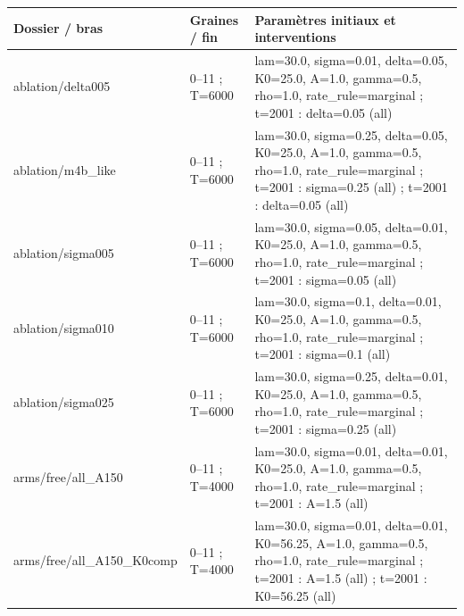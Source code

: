 {\scriptsize\begin{longtable}{@{}p{.27\linewidth}p{.14\linewidth}p{.53\linewidth}@{}}
\toprule Dossier / bras & Graines / fin & Paramètres initiaux et interventions \\\midrule\endhead
ablation/\allowbreak{}delta005 & 0--11 ; T=6000 & lam=30.0,\allowbreak{}  sigma=0.01,\allowbreak{}  delta=0.05,\allowbreak{}  K0=25.0,\allowbreak{}  A=1.0,\allowbreak{}  gamma=0.5,\allowbreak{}  rho=1.0,\allowbreak{}  rate\_\allowbreak{}rule=marginal ; t=2001 : delta=0.05 (all) \\
ablation/\allowbreak{}m4b\_\allowbreak{}like & 0--11 ; T=6000 & lam=30.0,\allowbreak{}  sigma=0.25,\allowbreak{}  delta=0.05,\allowbreak{}  K0=25.0,\allowbreak{}  A=1.0,\allowbreak{}  gamma=0.5,\allowbreak{}  rho=1.0,\allowbreak{}  rate\_\allowbreak{}rule=marginal ; t=2001 : sigma=0.25 (all) ; t=2001 : delta=0.05 (all) \\
ablation/\allowbreak{}sigma005 & 0--11 ; T=6000 & lam=30.0,\allowbreak{}  sigma=0.05,\allowbreak{}  delta=0.01,\allowbreak{}  K0=25.0,\allowbreak{}  A=1.0,\allowbreak{}  gamma=0.5,\allowbreak{}  rho=1.0,\allowbreak{}  rate\_\allowbreak{}rule=marginal ; t=2001 : sigma=0.05 (all) \\
ablation/\allowbreak{}sigma010 & 0--11 ; T=6000 & lam=30.0,\allowbreak{}  sigma=0.1,\allowbreak{}  delta=0.01,\allowbreak{}  K0=25.0,\allowbreak{}  A=1.0,\allowbreak{}  gamma=0.5,\allowbreak{}  rho=1.0,\allowbreak{}  rate\_\allowbreak{}rule=marginal ; t=2001 : sigma=0.1 (all) \\
ablation/\allowbreak{}sigma025 & 0--11 ; T=6000 & lam=30.0,\allowbreak{}  sigma=0.25,\allowbreak{}  delta=0.01,\allowbreak{}  K0=25.0,\allowbreak{}  A=1.0,\allowbreak{}  gamma=0.5,\allowbreak{}  rho=1.0,\allowbreak{}  rate\_\allowbreak{}rule=marginal ; t=2001 : sigma=0.25 (all) \\
arms/\allowbreak{}free/\allowbreak{}all\_\allowbreak{}A150 & 0--11 ; T=4000 & lam=30.0,\allowbreak{}  sigma=0.01,\allowbreak{}  delta=0.01,\allowbreak{}  K0=25.0,\allowbreak{}  A=1.0,\allowbreak{}  gamma=0.5,\allowbreak{}  rho=1.0,\allowbreak{}  rate\_\allowbreak{}rule=marginal ; t=2001 : A=1.5 (all) \\
arms/\allowbreak{}free/\allowbreak{}all\_\allowbreak{}A150\_\allowbreak{}K0comp & 0--11 ; T=4000 & lam=30.0,\allowbreak{}  sigma=0.01,\allowbreak{}  delta=0.01,\allowbreak{}  K0=56.25,\allowbreak{}  A=1.0,\allowbreak{}  gamma=0.5,\allowbreak{}  rho=1.0,\allowbreak{}  rate\_\allowbreak{}rule=marginal ; t=2001 : A=1.5 (all) ; t=2001 : K0=56.25 (all) \\

\end{longtable}}
